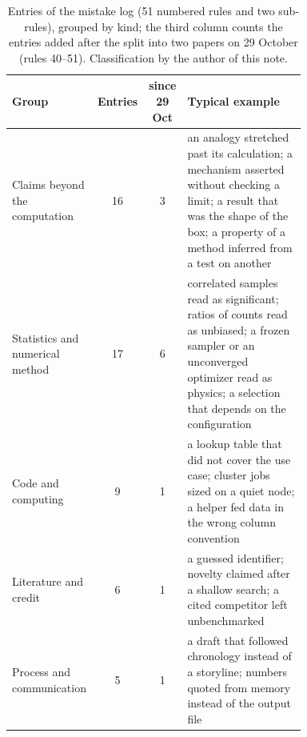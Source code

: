 \documentclass[11pt,a4paper]{article}
\begin{document}
\begin{table}[h]
\centering\small
\begin{tabular}{@{}p{0.25\linewidth}ccp{0.48\linewidth}@{}}
\toprule
Group & Entries & since 29 Oct & Typical example \\
\midrule
Claims beyond the computation & 16 & 3 & an analogy stretched past its calculation; a mechanism asserted without checking a limit; a result that was the shape of the box; a property of a method inferred from a test on another \\
Statistics and numerical method & 17 & 6 & correlated samples read as significant; ratios of counts read as unbiased; a frozen sampler or an unconverged optimizer read as physics; a selection that depends on the configuration \\
Code and computing & 9 & 1 & a lookup table that did not cover the use case; cluster jobs sized on a quiet node; a helper fed data in the wrong column convention \\
Literature and credit & 6 & 1 & a guessed identifier; novelty claimed after a shallow search; a cited competitor left unbenchmarked \\
Process and communication & 5 & 1 & a draft that followed chronology instead of a storyline; numbers quoted from memory instead of the output file \\
\bottomrule
\end{tabular}
\caption{Entries of the mistake log (51 numbered rules and two sub-rules), grouped by kind; the third column counts the entries added after the split into two papers on 29 October (rules 40--51). Classification by the author of this note.}\label{tab:mistakes}
\end{table}
\end{document}
